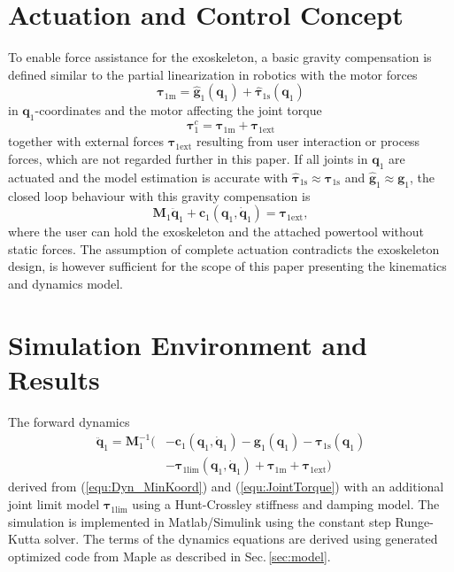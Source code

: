 \documentclass[letterpaper, 10 pt, conference]{ieeeconf}  %
\begin{document}
%

\section{Actuation and Control Concept}
\label{sec:actuation_control}

To enable force assistance for the exoskeleton, a basic gravity compensation is defined similar to the partial linearization in robotics with the motor forces
%
\begin{equation}
\bm{\tau}_{1\mathrm{m}} = \hat{\bm{g}}_1(\bm{q}_1) + \hat{\bm{\tau}}_{1\mathrm{s}}(\bm{q}_1)
\label{equ:GravKomp}
\end{equation}
%
in $\bm{q}_1$-coordinates and the motor affecting the joint torque
%
\begin{equation}
\bm{\tau}^c_1 = \bm{\tau}_{1\mathrm{m}} + \bm{\tau}_{1\mathrm{ext}}
\label{equ:JointTorque}
\end{equation}
%
together with external forces $\bm{\tau}_{1\mathrm{ext}}$ resulting from user interaction or process forces, which are not regarded further in this paper.
If all joints in $\bm{q}_1$ are actuated and the model estimation is accurate with $\hat{\bm{\tau}}_{1\mathrm{s}} \approx \bm{\tau}_{1\mathrm{s}}$ and $\hat{\bm{g}}_{1} \approx \bm{g}_{1}$, the closed loop behaviour with this gravity compensation is
%
\begin{equation}
\bm{M}_1\ddot{\bm{q}}_1+\bm{c}_1(\bm{q}_1,\dot{\bm{q}}_1) = \bm{\tau}_{1\mathrm{ext}},
\label{equ:closedloop}
\end{equation}
%
where the user can hold the exoskeleton and the attached powertool without static forces.
The assumption of complete actuation contradicts the exoskeleton design, is however sufficient for the scope of this paper presenting the kinematics and dynamics model.

\section{Simulation Environment and Results}
\label{sec:simulation}

The forward dynamics
\begin{align}
\ddot{\bm{q}}_1 = \bm{M}_1^{-1}( &-\bm{c}_1(\bm{q}_1,\dot{\bm{q}}_1)-\bm{g}_1(\bm{q}_1) -\bm{\tau}_{1\mathrm{s}}(\bm{q}_1) \nonumber \\
& - \bm{\tau}_{1\mathrm{lim}}(\bm{q}_1,\dot{\bm{q}}_1)  + \bm{\tau}_{1\mathrm{m}} + \bm{\tau}_{1\mathrm{ext}})
\label{equ:ForwDyn}
\end{align}
derived from (\ref{equ:Dyn_MinKoord}) and (\ref{equ:JointTorque}) with an additional joint limit model $\bm{\tau}_{1\mathrm{lim}}$ using a Hunt-Crossley stiffness and damping model.
The simulation is implemented in Matlab/Simulink using the constant step Runge-Kutta solver.
The terms of the dynamics equations are derived using generated optimized code from Maple as described in Sec.\,\ref{sec:model}.
\end{document}
